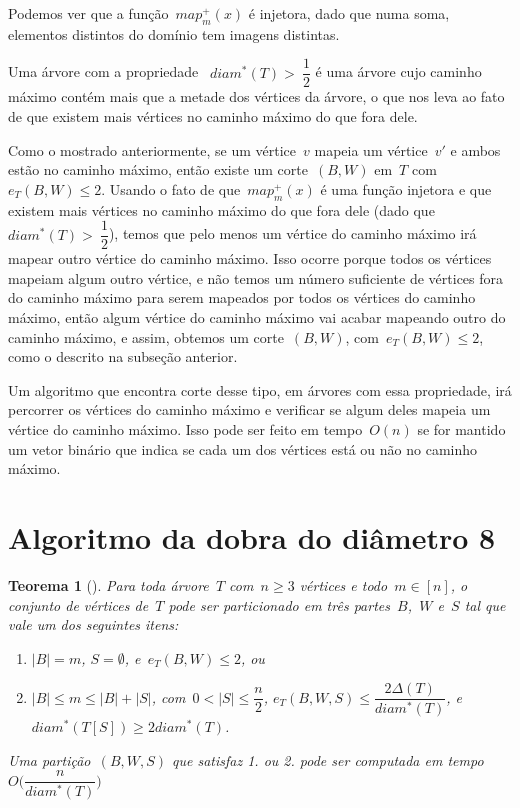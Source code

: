 \documentclass[a4paper,12pt]{article}
\newtheorem{teo}{Teorema}
\begin{document}
	\medskip
	\medskip

	Podemos ver que a função~$map^+_m(x)$ é injetora, dado que numa
	soma, elementos distintos do domínio tem imagens distintas.

	Uma árvore com a propriedade ~$diam^*(T)>~\dfrac{1}{2}$ é uma
	árvore cujo caminho máximo contém mais que a metade dos vértices
	da árvore, o que nos leva ao fato de que existem mais vértices
	no caminho máximo do que fora dele. 

	Como o mostrado anteriormente, se um vértice~$v$ mapeia um
	vértice~$v'$ e ambos estão no caminho máximo, então existe um
	corte~$(B,W)$ em~$T$ com~$e_T(B,W)\le 2$.
	Usando o fato de que~$map^+_m(x)$ é uma função injetora e que
	existem mais vértices no caminho máximo do que fora dele
	(dado que~$diam^*(T)>~\dfrac{1}{2}$),
	temos que pelo menos um vértice do caminho máximo irá mapear
	outro vértice do caminho máximo. Isso ocorre porque todos
	os vértices mapeiam algum outro vértice, e não temos um 
	número suficiente de vértices fora do caminho máximo para serem
	mapeados por todos os vértices do caminho máximo, então algum
	vértice do caminho máximo vai acabar mapeando outro do caminho
	máximo, e assim, obtemos um corte~$(B,W)$, com~$e_T(B,W)\le 2$,
	como o descrito na subseção anterior.

	Um algoritmo que encontra corte desse tipo, em árvores com essa 
	propriedade, irá percorrer os vértices do caminho máximo
	e verificar se algum deles mapeia um vértice do caminho máximo.
	Isso pode ser feito em tempo~$O(n)$ se for mantido um
	vetor binário que indica se cada um dos vértices está ou não no
	caminho máximo.





\newpage
\section {Algoritmo da dobra do diâmetro 8}
	
	\begin{teo}[{\cite[Theorem 4]{Schmidt15}}]
	\label{teo:dobraDiametro}
		Para toda árvore~$T$ com~$n\ge 3$ vértices e todo~$m\in [n]$,
		o conjunto de vértices de~$T$ pode ser particionado em três
		partes~$B$,~$W$ e~$S$ tal que vale um dos seguintes itens:
		\begin{enumerate}
			\item $|B|=m$, $S=\emptyset$, e~$e_T(B,W)\le 2$, ou
			\item $|B|\le m\le |B|+|S|$, com~$0<|S|\le\dfrac{n}{2}$,
			$e_T(B,W,S)\le \dfrac{2 \Delta(T)}{diam^*(T)}$, 
			e~$diam^*(T[S])\ge 2diam^*(T)$.
		\end{enumerate}
		Uma partição~$(B,W,S)$ que satisfaz 1. ou 2. pode ser
		computada em tempo~$O\Big(\dfrac{n}{diam^*(T)}\Big)$ 
	\end{teo}
\end{document}
